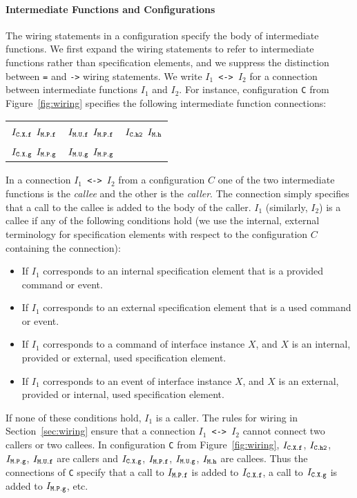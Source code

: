 \documentclass[11pt]{article}
\newcommand{\code}[1]{{\tt #1}}
\begin{document}
\paragraph{Intermediate Functions and Configurations}

The wiring statements in a configuration specify the body of intermediate
functions. We first expand the wiring statements to refer to intermediate
functions rather than specification elements, and we suppress the
distinction between \code{=} and \code{->} wiring statements. We write
\code{$I_1$ <-> $I_2$} for a connection between intermediate functions
\code{$I_1$} and \code{$I_2$}. For instance, configuration \code{C} from
Figure~\ref{fig:wiring} specifies the following intermediate function
connections:\\
\begin{tabular}{ccc}
$I_\code{C.X.f}$ \code{<->} $I_\code{M.P.f}$ & 
$I_\code{M.U.f}$ \code{<->} $I_\code{M.P.f}$ & 
$I_\code{C.h2}$ \code{<->} $I_\code{M.h}$ \\
$I_\code{C.X.g}$ \code{<->} $I_\code{M.P.g}$ & 
$I_\code{M.U.g}$ \code{<->} $I_\code{M.P.g}$
\end{tabular}

In a connection \code{$I_1$ <-> $I_2$} from a configuration
$C$ one of the two intermediate functions is the \emph{callee} and the
other is the \emph{caller}. The connection simply specifies that a call to
the callee is added to the body of the caller. \code{$I_1$}
(similarly, \code{$I_2$}) is a callee if any of the following conditions hold
(we use the internal, external terminology for specification elements with
respect to the configuration $C$ containing the connection):
\begin{itemize}
\item If \code{$I_1$} corresponds to an internal specification element that
is a provided command or event.
\item If \code{$I_1$} corresponds to an external specification element that
is a used command or event.
\item If \code{$I_1$} corresponds to a command of interface instance $X$,
and $X$ is an internal, provided or external, used specification element.
\item If \code{$I_1$} corresponds to an event of interface instance $X$,
and $X$ is an external, provided or internal, used specification element.
\end{itemize}
If none of these conditions hold, \code{$I_1$} is a caller. The rules for
wiring in Section~\ref{sec:wiring} ensure that a connection \code{$I_1$ <->
$I_2$} cannot connect two callers or two callees. In configuration \code{C}
from Figure~\ref{fig:wiring}, $I_\code{C.X.f}$, $I_\code{C.h2}$,
$I_\code{M.P.g}$, $I_\code{M.U.f}$ are callers and $I_\code{C.X.g}$,
$I_\code{M.P.f}$, $I_\code{M.U.g}$, $I_\code{M.h}$ are callees. Thus the
connections of \code{C} specify that a call to $I_\code{M.P.f}$ is added to
$I_\code{C.X.f}$, a call to $I_\code{C.X.g}$ is added to $I_\code{M.P.g}$,
etc.
\end{document}
